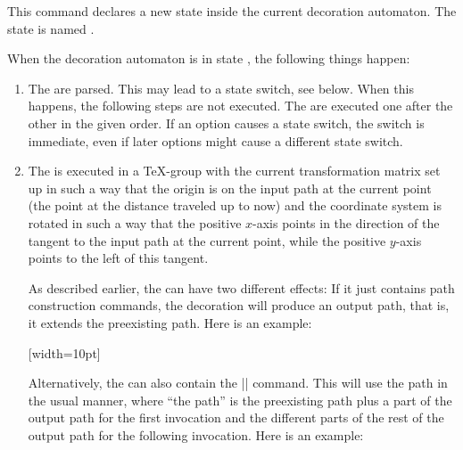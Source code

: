 \begin{command}{\pgfdeclaredecoration{}}
  \begin{command}{\state{}}
    This command declares a new state inside the current decoration
    automaton. The state is named .

    When the decoration automaton is in state , the following things
    happen:
    \begin{enumerate}
    \item
      The  are parsed. This may lead to a
      state switch, see below. When this happens, the following steps are not
      executed. The  are executed one after the other in
      the given order. If an option causes a state switch, the switch
      is immediate, even if later options might cause a different
      state switch.
    \item
      The  is executed in a \TeX-group with the current
      transformation matrix set up in such a way that the origin is on
      the input path at the current point (the point at the distance
      traveled up to now) and the coordinate system is rotated in
      such a way that the positive $x$-axis points in the direction of
      the tangent to the input path at the current point, while the
      positive $y$-axis points to the left of this tangent.

      As described earlier, the  can have two different
      effects: If it just contains path construction commands, the
      decoration will produce an output path, that is, it extends the
      preexisting path. Here is an example:

\begin{codeexample}[]
{
  [width=10pt]
  {
    \pgfpathlineto{\pgfpoint{0pt}{5pt}}
    \pgfpathlineto{\pgfpoint{5pt}{5pt}}
    \pgfpathlineto{\pgfpoint{5pt}{-5pt}}
    \pgfpathlineto{\pgfpoint{10pt}{-5pt}}
    \pgfpathlineto{\pgfpoint{10pt}{0pt}}
  }
  {
    \pgfpathlineto{\pgfpointdecoratedpathlast}
  }
}
\end{codeexample}

    Alternatively, the  can also contain the
    |\pgfusepath| command. This will use the path in the usual manner,
    where ``the path'' is the preexisting path plus a part of the
    output path for the first invocation and the different parts of
    the rest of the output path for the following invocation. Here is
    an example:


\end{enumerate}
\end{command}
\end{command}
